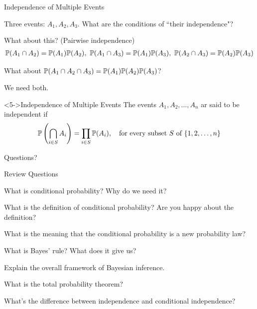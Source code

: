 \begin{frame}{Independence of Multiple Events}

\plitemsep 0.1in
\bci 

\item<1-> Three events: $A_1, A_2, A_3.$ What are the conditions of ``their independence"?

\item<2-> What about this? (Pairwise independence)
\begin{align*}
\mathbb{P}( A_1 \cap A_2 ) = \mathbb{P}( A_1 ) \mathbb{P}( A_2 ), \
\mathbb{P}( A_1 \cap A_3 ) = \mathbb{P}( A_1 ) \mathbb{P}( A_3 ), \
\mathbb{P}( A_2 \cap A_3 ) = \mathbb{P}( A_2 ) \mathbb{P}( A_3 )
\end{align*}

\item<3-> What about $\mathbb{P}( A_1 \cap A_2 \cap A_3 ) = \mathbb{P}( A_1 ) \mathbb{P}( A_2 ) \mathbb{P}( A_3 )$?

\item<4-> We need both. 

\begin{block}<5->{Independence of Multiple Events}
The events $A_1,A_2, \ldots, A_n$ ar said to be independent if
$$
\mathbb{P}\left( \bigcap_{i \in S} A_i \right) = \prod_{i \in S} \mathbb{P}( A_i ), \quad \text{for every subset } S \text{ of } \{1,2, \ldots, n \}
$$
\end{block}
\eci 
\end{frame}


\begin{frame}{}
\vspace{2cm}
\LARGE Questions?

\end{frame}

\begin{frame}{Review Questions}
\bce[1)]
\item What is conditional probability? Why do we need it?

\item What is the definition of conditional probability? Are you happy
  about the definition?

\item What is the meaning that the conditional probability is a new
  probability law?

\item What is Bayes' rule? What does it give us?

\item Explain the overall framework of Bayesian inference.

\item What is the total probability theorem?

\item What's the difference between independence and conditional independence?

\ece
\end{frame}


